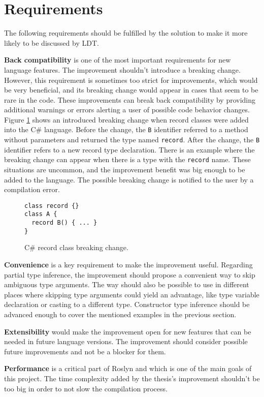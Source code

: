\section{Requirements}

The following requirements should be fulfilled by the solution to make it more likely to be discussed by \ac{LDT}.
\par
\textbf{Back compatibility} is one of the most important requirements for new language features. 
The improvement shouldn’t introduce a breaking change. However, this requirement is sometimes too strict for improvements, which would be very beneficial, and its breaking change would appear in cases that seem to be rare in the code. 
These improvements can break back compatibility by providing additional warnings or errors alerting a user of possible code behavior changes.
Figure \ref{img39:brkCh} shows an introduced breaking change when record classes were added into the C\# language. 
Before the change, the \texttt{B} identifier referred to a method without parameters and returned the type named \texttt{record}. 
After the change, the \texttt{B} identifier refers to a new record type declaration. 
There is an example where the breaking change can appear when there is a type with the \texttt{record} name. 
These situations are uncommon, and the improvement benefit was big enough to be added to the language. 
The possible breaking change is notified to the user by a compilation error.
\begin{figure}[h]
\begin{lstlisting}[style=csharp]
class record {}
class A {
  record B() { ... }
}
\end{lstlisting}
\caption{C\# record class breaking change.}
\label{img39:brkCh}
\end{figure}
\par
\textbf{Convenience} is a key requirement to make the improvement useful. 
Regarding partial type inference, the improvement should propose a convenient way to skip ambiguous type arguments. 
The way should also be possible to use in different places where skipping type arguments could yield an advantage, like type variable declaration or casting to a different type. 
Constructor type inference should be advanced enough to cover the mentioned examples in the previous section.
\par
\textbf{Extensibility} would make the improvement open for new features that can be needed in future language versions. 
The improvement should consider possible future improvements and not be a blocker for them.
\par
\textbf{Performance} is a critical part of Roslyn and which is one of the main goals of this project.
The time complexity added by the thesis’s improvement shouldn’t be too big in order to not slow the compilation process.

